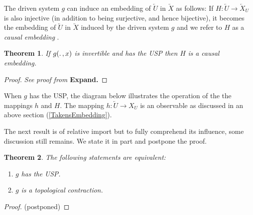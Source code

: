 \documentclass[a4paper,12pt,twoside]{book}
\newtheorem{Theorem}{Theorem}[]
\begin{document}
The driven system $g$ can induce an embedding of $\overleftarrow{U}$ in $\overleftarrow{X}$ as follows: If $H:\overleftarrow{U}\to\overleftarrow{X}_U$ is also injective (in addition to being surjective, and hence bijective), it becomes the embedding of $\overleftarrow{U}$ in $\overleftarrow{X}$ induced by the driven system $g$ and we refer to $H$ as a \emph{causal embedding} . 

\begin{Theorem}
 If $g(\ldotp,x)$ is invertible and has the USP then $H$ is a causal embedding. 
\end{Theorem}
\begin{proof}
  \emph{See proof from \cite{manjunath2021universal}}  \textbf{Expand.}
\end{proof}

When $g$ has the USP, the diagram below illustrates the operation of the the mappings $h$ and $H$. The mapping $h:\overleftarrow{U}\to{X_U}$ is an observable as discussed in an above section (\ref{TakensEmbedding}).  

\begin{figure}[ht]
  \centering
  \label{fig:actionh_H}
\end{figure}

The next result is of relative import but to fully comprehend its influence, some discussion still remains. We state it in part and postpone the proof.

\begin{Theorem}
  The following statements are equivalent:
  \vspace{-8mm}
  \begin{enumerate}[noitemsep, label=\roman*.]
    \item $g$ has the USP. 
    \item $g$ is a topological contraction.
  \end{enumerate}
\end{Theorem}
\begin{proof}
  (postponed) 
\end{proof}

\end{document}
